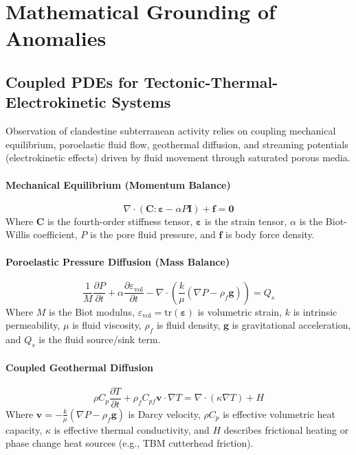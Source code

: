 \documentclass[11pt,a4paper]{article}
\begin{document}
\section{Mathematical Grounding of Anomalies}

\subsection{Coupled PDEs for Tectonic-Thermal-Electrokinetic Systems}
Observation of clandestine subterranean activity relies on coupling mechanical equilibrium, poroelastic fluid flow, geothermal diffusion, and streaming potentials (electrokinetic effects) driven by fluid movement through saturated porous media.

\paragraph{Mechanical Equilibrium (Momentum Balance)}
\begin{equation}
\nabla \cdot \left(\mathbf{C} : \boldsymbol{\varepsilon} - \alpha P \mathbf{I}\right) + \mathbf{f} = \mathbf{0}
\end{equation}
Where $\mathbf{C}$ is the fourth-order stiffness tensor, $\boldsymbol{\varepsilon}$ is the strain tensor, $\alpha$ is the Biot-Willis coefficient, $P$ is the pore fluid pressure, and $\mathbf{f}$ is body force density.

\paragraph{Poroelastic Pressure Diffusion (Mass Balance)}
\begin{equation}
\frac{1}{M}\frac{\partial P}{\partial t} + \alpha \frac{\partial \varepsilon_{\text{vol}}}{\partial t} - \nabla \cdot \left( \frac{k}{\mu} \left(\nabla P - \rho_f \mathbf{g}\right) \right) = Q_s
\end{equation}
Where $M$ is the Biot modulus, $\varepsilon_{\text{vol}} = \mathrm{tr}(\boldsymbol{\varepsilon})$ is volumetric strain, $k$ is intrinsic permeability, $\mu$ is fluid viscosity, $\rho_f$ is fluid density, $\mathbf{g}$ is gravitational acceleration, and $Q_s$ is the fluid source/sink term.

\paragraph{Coupled Geothermal Diffusion}
\begin{equation}
\rho C_p \frac{\partial T}{\partial t} + \rho_f C_{pf} \mathbf{v} \cdot \nabla T = \nabla \cdot (\kappa \nabla T) + H
\end{equation}
Where $\mathbf{v} = -\frac{k}{\mu} (\nabla P - \rho_f \mathbf{g})$ is Darcy velocity, $\rho C_p$ is effective volumetric heat capacity, $\kappa$ is effective thermal conductivity, and $H$ describes frictional heating or phase change heat sources (e.g., TBM cutterhead friction).
\end{document}
